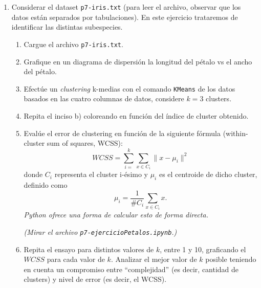 \documentclass[a4paper,11pt]{article}
\theoremstyle{definition}
\begin{document}
\begin{enumerate}
\begin{enumerate}
\end{enumerate}



\item Considerar el dataset \texttt{p7-iris.txt} (para leer el archivo, observar que los datos est\'an separados por tabulaciones). En este ejercicio trataremos de identificar las distintas subespecies.
\begin{enumerate}
	\item Cargue el archivo \texttt{p7-iris.txt}.
	\item Grafique en un diagrama de dispersi\'on la longitud del p\'etalo vs el ancho del p\'etalo.
	\item Efect\'ue un \textit{clustering} k-medias con el comando \texttt{KMeans} de los datos basados en las cuatro columnas de datos, considere $k=3$ clusters.
	\item Repita el inciso b) coloreando en funci\'on del \'indice de cluster obtenido.
	\item Eval\'ue el error de clustering en funci\'on de la siguiente f\'ormula (within-cluster sum of squares, WCSS):
	$$
	WCSS = \sum_{i=}^k \sum_{x \in C_i} \| x - \mu_i\|^2
	$$
	donde $C_i$ representa el cluster i-\'esimo y $\mu_i$ es el centroide de dicho cluster, definido como
	$$
	\mu_i = \frac{1}{\#C_i}\sum_{x \in C_i} x.
	$$
	\textit{Python ofrece una forma de calcular esto de forma directa.}
	
	 \textit{(Mirar el archivo \texttt{p7-ejercicioPetalos.ipynb}.)}
	\item Repita el ensayo para distintos valores de $k$, entre 1 y 10, graficando el $WCSS$ para cada valor de $k$. Analizar el mejor valor de $k$ posible teniendo en cuenta
	un compromiso entre ``complejidad'' (es decir, cantidad de clusters) y nivel de error (es decir, el WCSS).
	
\end{enumerate}





\end{enumerate}
\end{document}
